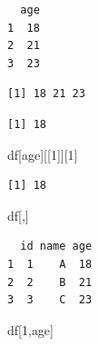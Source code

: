 \documentclass[
  letterpaper,
  DIV=11,
  numbers=noendperiod]{scrreprt}
\newenvironment{Shaded}{\begin{snugshade}}{\end{snugshade}}
\newcommand{\DecValTok}[1]{\textcolor[rgb]{0.68,0.00,0.00}{#1}}
\newcommand{\NormalTok}[1]{\textcolor[rgb]{0.00,0.23,0.31}{#1}}
\newcommand{\SpecialCharTok}[1]{\textcolor[rgb]{0.37,0.37,0.37}{#1}}
\newcommand{\StringTok}[1]{\textcolor[rgb]{0.13,0.47,0.30}{#1}}
\begin{document}
\begin{verbatim}
  age
1  18
2  21
3  23
\end{verbatim}

\begin{Shaded}
\end{Shaded}

\begin{verbatim}
[1] 18 21 23
\end{verbatim}

\begin{Shaded}
\end{Shaded}

\begin{verbatim}
[1] 18
\end{verbatim}

\begin{Shaded}
\begin{Highlighting}[]
\NormalTok{df[}\StringTok{\textquotesingle{}age\textquotesingle{}}\NormalTok{][[}\DecValTok{1}\NormalTok{]][}\DecValTok{1}\NormalTok{]}
\end{Highlighting}
\end{Shaded}

\begin{verbatim}
[1] 18
\end{verbatim}

\begin{Shaded}
\begin{Highlighting}[]
\NormalTok{df[,]}
\end{Highlighting}
\end{Shaded}

\begin{verbatim}
  id name age
1  1    A  18
2  2    B  21
3  3    C  23
\end{verbatim}

\begin{Shaded}
\begin{Highlighting}[]
\NormalTok{df[}\DecValTok{1}\NormalTok{,}\StringTok{\textquotesingle{}age\textquotesingle{}}\NormalTok{]}
\end{Highlighting}
\end{Shaded}
\end{document}
